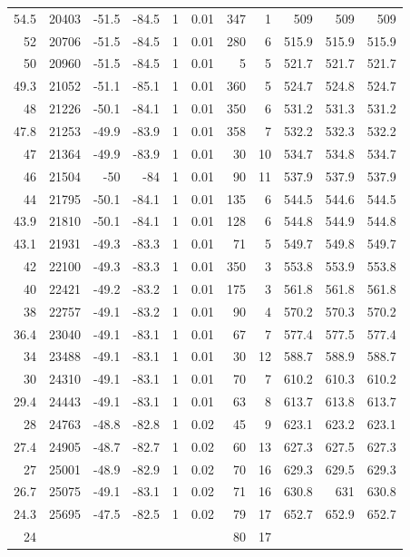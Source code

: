\documentclass{article}
\begin{document}
\begin{longtable}{r|r|r|r|r|r|r|r|r|r|r}
54.5 & 20403 & -51.5 & -84.5 & 1 & 0.01 & 347 & 1 & 509 & 509 & 509 \\
52 & 20706 & -51.5 & -84.5 & 1 & 0.01 & 280 & 6 & 515.9 & 515.9 & 515.9 \\
50 & 20960 & -51.5 & -84.5 & 1 & 0.01 & 5 & 5 & 521.7 & 521.7 & 521.7 \\
49.3 & 21052 & -51.1 & -85.1 & 1 & 0.01 & 360 & 5 & 524.7 & 524.8 & 524.7 \\
48 & 21226 & -50.1 & -84.1 & 1 & 0.01 & 350 & 6 & 531.2 & 531.3 & 531.2 \\
47.8 & 21253 & -49.9 & -83.9 & 1 & 0.01 & 358 & 7 & 532.2 & 532.3 & 532.2 \\
47 & 21364 & -49.9 & -83.9 & 1 & 0.01 & 30 & 10 & 534.7 & 534.8 & 534.7 \\
46 & 21504 & -50 & -84 & 1 & 0.01 & 90 & 11 & 537.9 & 537.9 & 537.9 \\
44 & 21795 & -50.1 & -84.1 & 1 & 0.01 & 135 & 6 & 544.5 & 544.6 & 544.5 \\
43.9 & 21810 & -50.1 & -84.1 & 1 & 0.01 & 128 & 6 & 544.8 & 544.9 & 544.8 \\
43.1 & 21931 & -49.3 & -83.3 & 1 & 0.01 & 71 & 5 & 549.7 & 549.8 & 549.7 \\
42 & 22100 & -49.3 & -83.3 & 1 & 0.01 & 350 & 3 & 553.8 & 553.9 & 553.8 \\
40 & 22421 & -49.2 & -83.2 & 1 & 0.01 & 175 & 3 & 561.8 & 561.8 & 561.8 \\
38 & 22757 & -49.1 & -83.2 & 1 & 0.01 & 90 & 4 & 570.2 & 570.3 & 570.2 \\
36.4 & 23040 & -49.1 & -83.1 & 1 & 0.01 & 67 & 7 & 577.4 & 577.5 & 577.4 \\
34 & 23488 & -49.1 & -83.1 & 1 & 0.01 & 30 & 12 & 588.7 & 588.9 & 588.7 \\
30 & 24310 & -49.1 & -83.1 & 1 & 0.01 & 70 & 7 & 610.2 & 610.3 & 610.2 \\
29.4 & 24443 & -49.1 & -83.1 & 1 & 0.01 & 63 & 8 & 613.7 & 613.8 & 613.7 \\
28 & 24763 & -48.8 & -82.8 & 1 & 0.02 & 45 & 9 & 623.1 & 623.2 & 623.1 \\
27.4 & 24905 & -48.7 & -82.7 & 1 & 0.02 & 60 & 13 & 627.3 & 627.5 & 627.3 \\
27 & 25001 & -48.9 & -82.9 & 1 & 0.02 & 70 & 16 & 629.3 & 629.5 & 629.3 \\
26.7 & 25075 & -49.1 & -83.1 & 1 & 0.02 & 71 & 16 & 630.8 & 631 & 630.8 \\
24.3 & 25695 & -47.5 & -82.5 & 1 & 0.02 & 79 & 17 & 652.7 & 652.9 & 652.7 \\
24 &   &   &   &   &   & 80 & 17 &   &   &  \\
\end{longtable}%
\end{document}
